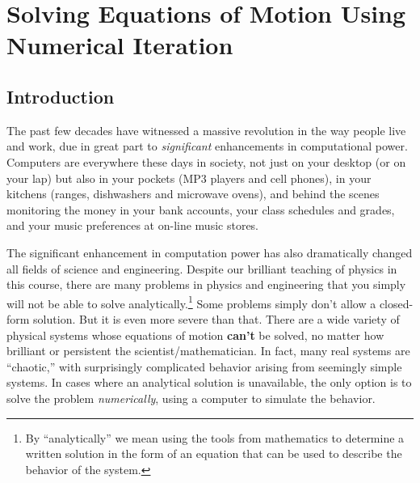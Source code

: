 \chapter[Numerical Iteration]{Solving Equations of Motion Using 
Numerical Iteration}
\label{chapter:numerical}


\section{Introduction}

The past few decades have witnessed a massive revolution in the way
people live and work, due in great part to {\em significant} enhancements
in computational power.  Computers are everywhere these days in society,
not just on your desktop (or on your lap) but also in your pockets
(MP3 players and cell phones), in your kitchens (ranges, dishwashers
and microwave ovens), and behind the scenes monitoring the money in
your bank accounts, your class schedules and grades, and your music
preferences at on-line music stores.  

The significant enhancement in
computation power has also dramatically changed all fields of science
and engineering.  Despite our brilliant teaching of physics
in this course, there are many problems in physics and engineering that
you simply will not be able to solve analytically.\footnote{By ``analytically''
we mean using the tools from mathematics to determine a written solution
in the form of an equation that can be used to describe the behavior of the
system.}  Some problems simply don't allow a closed-form solution.
But it is even more severe than that.  There are a wide variety of
physical systems whose equations of motion {\bf can't} be solved, 
no matter how brilliant or persistent the 
scientist/mathematician.  In fact, many real systems are ``chaotic,''
with surprisingly complicated behavior arising from seemingly simple
systems.  In cases where an analytical solution is unavailable, the 
only option is to solve the problem {\em numerically}, using a 
computer to simulate the behavior.

